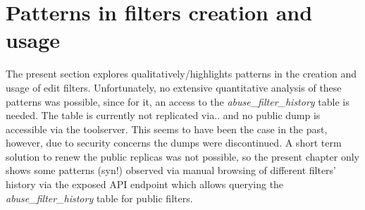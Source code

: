 \section{Patterns in filters creation and usage}

The present section explores qualitatively/highlights patterns in the creation and usage of edit filters.
Unfortunately, no extensive quantitative analysis of these patterns was possible, since for it, an access to the \emph{abuse\_filter\_history} table is needed.
The table is currently not replicated via.. and no public dump is accessible via the toolserver. %
This seems to have been the case in the past, however, due to security concerns the dumps were discontinued. %
A short term solution to renew the public replicas was not possible, so the present chapter only shows some patterns (syn!) observed via manual browsing of different filters' history via the exposed API endpoint which allows querying the \emph{abuse\_filter\_history} table for public filters.

